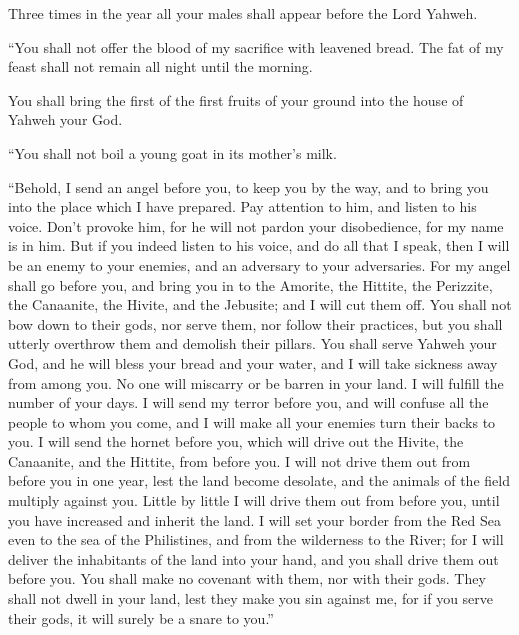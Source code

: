 {Three times in the year all your males shall appear before the Lord Yahweh.
\par }{\PP {}“You shall not offer the blood of my sacrifice with leavened bread. The fat of my feast shall not remain all night until the morning.
\par }{\PP {}You shall bring the first of the first fruits of your ground into the house of Yahweh your God.
\par }{\PP “You shall not boil a young goat in its mother’s milk.
\par }{\PP {}“Behold, I send an angel before you, to keep you by the way, and to bring you into the place which I have prepared.
Pay attention to him, and listen to his voice. Don’t provoke him, for he will not pardon your disobedience, for my name is in him.
But if you indeed listen to his voice, and do all that I speak, then I will be an enemy to your enemies, and an adversary to your adversaries.
For my angel shall go before you, and bring you in to the Amorite, the Hittite, the Perizzite, the Canaanite, the Hivite, and the Jebusite; and I will cut them off.
You shall not bow down to their gods, nor serve them, nor follow their practices, but you shall utterly overthrow them and demolish their pillars.
You shall serve Yahweh your God, and he will bless your bread and your water, and I will take sickness away from among you.
No one will miscarry or be barren in your land. I will fulfill the number of your days.
I will send my terror before you, and will confuse all the people to whom you come, and I will make all your enemies turn their backs to you.
I will send the hornet before you, which will drive out the Hivite, the Canaanite, and the Hittite, from before you.
I will not drive them out from before you in one year, lest the land become desolate, and the animals of the field multiply against you.
Little by little I will drive them out from before you, until you have increased and inherit the land.
I will set your border from the Red Sea even to the sea of the Philistines, and from the wilderness to the River; for I will deliver the inhabitants of the land into your hand, and you shall drive them out before you.
You shall make no covenant with them, nor with their gods.
They shall not dwell in your land, lest they make you sin against me, for if you serve their gods, it will surely be a snare to you.”

}
